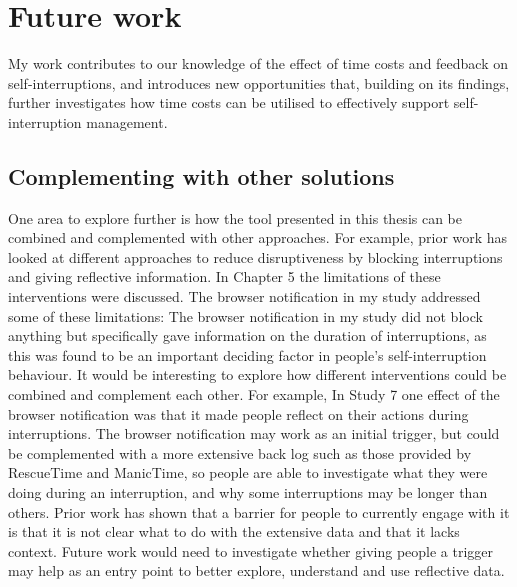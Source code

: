 \section{Future work}
My work contributes to our knowledge of the effect of time costs and feedback on self-interruptions, and introduces new opportunities that, building on its findings, further investigates how time costs can be utilised to effectively support self-interruption management.



\subsection{Complementing with other solutions}
One area to explore further is how the tool presented in this thesis can be combined and complemented with other approaches. For example, prior work has looked at different approaches to reduce disruptiveness by blocking interruptions and giving reflective information. In Chapter 5 the limitations of these interventions were discussed. The browser notification in my study addressed some of these limitations: The browser notification in my study did not block anything but specifically gave information on the duration of interruptions, as this was found to be an important deciding factor in people's self-interruption behaviour. It would be interesting to explore how different interventions could be combined and complement each other. For example, In Study 7 one effect of the browser notification was that it made people reflect on their actions during interruptions. The browser notification may work as an initial trigger, but could be complemented with a more extensive back log such as those provided by RescueTime and ManicTime, so people are able to investigate what they were doing during an interruption, and why some interruptions may be longer than others. Prior work has shown that a barrier for people to currently engage with it is that it is not clear what to do with the extensive data and that it lacks context. Future work would need to investigate whether giving people a trigger may help as an entry point to better explore, understand and use  reflective data. 

